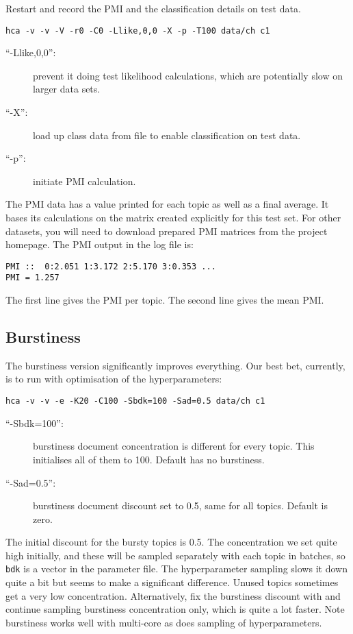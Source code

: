 \documentclass[a4paper,english]{article}
\begin{document}
Restart and record the 
PMI and the classification details on test data.
\begin{verbatim}
hca -v -v -V -r0 -C0 -Llike,0,0 -X -p -T100 data/ch c1
\end{verbatim}
\begin{description}
\item[``-Llike,0,0'':] prevent it 
doing test likelihood calculations, which are potentially slow
on larger data sets.
\item[``-X'':] load up class data from  file to
enable classification on test data.
\item[``-p'':] initiate PMI calculation.
\end{description}
The PMI data has a value printed for each topic as well as a 
final average.  It bases its calculations on the matrix
 created explicitly for this test set.
For other datasets, you will need to download prepared
PMI matrices from the project homepage.
The PMI output in the log file is:
\begin{verbatim}
PMI ::  0:2.051 1:3.172 2:5.170 3:0.353 ...
PMI = 1.257
\end{verbatim}
The first line gives the PMI per topic.
The second line gives the mean PMI.

\subsection{Burstiness}

The burstiness version significantly improves everything.
Our best bet, currently, is to run
with optimisation of the hyperparameters:
\begin{verbatim}
hca -v -v -e -K20 -C100 -Sbdk=100 -Sad=0.5 data/ch c1
\end{verbatim}
\begin{description}
\item[``-Sbdk=100'':]  burstiness document concentration is different
for every topic.  This initialises all of them to 100.
Default has no burstiness.
\item[``-Sad=0.5'':] burstiness document discount set to 
0.5, same for all topics.  Default is zero.
\end{description}
The initial discount for the bursty topics is
0.5.   The concentration we set quite high initially, 
and these will be sampled separately with
each topic in batches, so \texttt{bdk} is a vector in the
parameter file.
The hyperparameter sampling slows it down quite a bit but seems to
make a significant difference.  Unused topics sometimes
get a very low concentration.
Alternatively, fix the burstiness discount with 
 and continue sampling burstiness concentration only,
which is quite a lot faster.
Note burstiness works well with multi-core as does 
sampling of hyperparameters.
\end{document}
